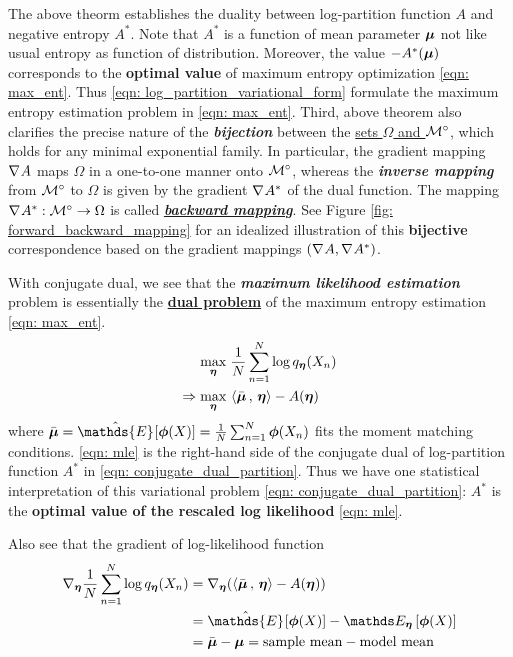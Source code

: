 \documentclass[11pt]{article}
\begin{document}
The above theorm establishes the duality between log-partition function $A$ and negative entropy $A^{*}$. Note that $A^{*}$ is a function of mean parameter $\boldsymbol{\mu}$ not like usual entropy as function of distribution. Moreover, the value $-A^{*}(\boldsymbol{\mu})$ corresponds to the \textbf{optimal value} of maximum entropy optimization \eqref{eqn: max_ent}.  Thus \eqref{eqn: log_partition_variational_form} formulate the maximum entropy estimation problem in \eqref{eqn: max_ent}. Third, above theorem  also clarifies the precise nature of the \textbf{\emph{bijection}} between the \underline{sets $\Omega$ and ${\mathcal M}^{\circ}$}, which holds for any minimal exponential family.  In particular, the gradient mapping $\nabla_{}{A}$ maps $\Omega$ in a one-to-one manner onto ${\mathcal M}^{\circ}$, whereas the \textbf{\emph{inverse mapping}} from ${\mathcal M}^{\circ}$ to $\Omega$ is given by the gradient $\nabla_{}{A^{*}}$ of the dual function. The mapping $\nabla_{}{A^{*}}: {\mathcal M}^{\circ} \rightarrow \Omega$ is called \underline{\textbf{\emph{backward mapping}}}.  See Figure \ref{fig: forward_backward_mapping} for an idealized illustration of this \textbf{bijective} correspondence based on the gradient mappings $(\nabla_{}{A}, \nabla_{}{A^{*}})$.

With conjugate dual, we see that the \textbf{\emph{maximum likelihood estimation}} problem is essentially the \underline{\textbf{dual problem}} of the maximum entropy estimation \eqref{eqn: max_ent}.
\begin{align}
\max_{\boldsymbol{\eta}} &\; \frac{1}{N}\sum_{n=1}^{N}\log q_{\boldsymbol{\eta}}(X_{n}) \nonumber\\
\Rightarrow \max_{\boldsymbol{\eta}}&\, \left\langle \bar{\boldsymbol{\mu}}\,,\, \boldsymbol{\eta} \right\rangle - A(\boldsymbol{\eta}) \label{eqn: mle}
\end{align} where $\bar{\mb{\mu}} = \hat{\mathds{E}}_{}[\mb{\phi}(X)] = \frac{1}{N}\sum_{n=1}^{N}\mb{\phi}(X_{n})$ fits the moment matching conditions.  \eqref{eqn: mle} is the right-hand side of the conjugate dual of log-partition function $A^{*}$ in \eqref{eqn: conjugate_dual_partition}. Thus we have one statistical interpretation of this variational problem \eqref{eqn: conjugate_dual_partition}: $A^{*}$ is the \textbf{optimal value of the rescaled log likelihood} \eqref{eqn: mle}. 

Also see that the gradient of log-likelihood function 
\begin{align}
\grad{\mb{\eta}}{\frac{1}{N}\sum_{n=1}^{N}\log q_{\mb{\eta}}(X_{n}) }&= \grad{\mb{\eta}}{\paren{\inn{\bar{\mb{\mu}}}{\mb{\eta}} - A(\mb{\eta}) }} \nonumber\\
&=  \hat{\mathds{E}}_{}[\mb{\phi}(X)] - \E{\mb{\eta}}{\mb{\phi}(X)} \label{eqn: grad_log_likelihood}\\
&=  \bar{\mb{\mu}} - \mb{\mu}  = \text{sample mean} - \text{model mean}  \nonumber
\end{align}
\end{document}
